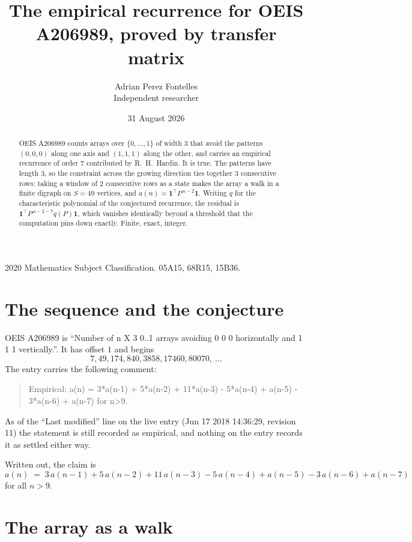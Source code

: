 \documentclass[11pt,a4paper]{article}
\title{The empirical recurrence for OEIS A206989, proved by transfer matrix}
\author{Adrian Perez Fontelles\\ \small Independent researcher}
\date{31 August 2026}
\theoremstyle{plain}
\theoremstyle{definition}
\begin{document}
\maketitle

\begin{abstract}
OEIS A206989 counts arrays over $\{0,\dots,1\}$ of width $3$ that avoid the patterns
$(0,0,0)$ along one axis and $(1,1,1)$ along the other, and carries an empirical recurrence of
order $7$ contributed by R.~H.~Hardin. It is true. The patterns have length $3$, so
the constraint across the growing direction ties together $3$ consecutive rows: taking a
window of $2$ consecutive rows as a state makes the array a walk in a finite digraph
on $S=49$ vertices, and $a(n)=\mathbf{1}^{\!\top}P^{\,n-2}\mathbf{1}$. Writing $q$
for the characteristic polynomial of the conjectured recurrence, the residual is
$\mathbf{1}^{\!\top}P^{\,n-2-7}q(P)\mathbf{1}$, which vanishes identically
beyond a threshold that the computation pins down exactly. Finite, exact, integer.
\end{abstract}

\noindent\small 2020 Mathematics Subject Classification. 05A15, 68R15, 15B36.\normalsize

\section{The sequence and the conjecture}

OEIS A206989 is ``Number of n X 3 0..1 arrays avoiding 0 0 0 horizontally and 1 1 1 vertically.''. It has offset
$1$ and begins
\[
7, 49, 174, 840, 3858, 17460, 80070,\ \dots
\]
The entry carries the following comment:
\begin{quote}\small
Empirical: a(n) = 3*a(n-1) + 5*a(n-2) + 11*a(n-3) - 5*a(n-4) + a(n-5) - 3*a(n-6) + a(n-7) for n>9.
\end{quote}
As of the ``Last modified'' line on the live entry (Jun 17 2018 14:36:29, revision
11) the statement is still recorded as empirical, and nothing on the entry
records it as settled either way.

Written out, the claim is
\begin{equation}\label{eq:conj}
a(n)\;=\;3\,a(n-1) + 5\,a(n-2) + 11\,a(n-3) - 5\,a(n-4) + a(n-5) - 3\,a(n-6) + a(n-7)
\end{equation}
for all $n>9$. 

\section{The array as a walk}
\end{document}
